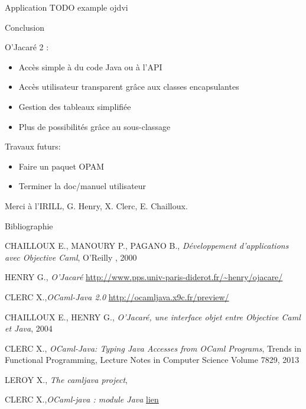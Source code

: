 \documentclass[xcolor={table,dvipsnames}]{beamer}
\begin{document}
\begin{frame}{Application}
TODO example ojdvi
\end{frame}


\begin{frame}{Conclusion}

O'Jacaré 2 :
\begin{itemize}
\item Accès simple à du code Java ou à l'API
\item Accès utilisateur transparent grâce aux classes encapsulantes
\item Gestion des tableaux simplifiée
\item Plus de possibilités grâce au sous-classage
\end{itemize}

Travaux futurs:
\begin{itemize}
\item Faire un paquet OPAM
\item Terminer la doc/manuel utilisateur
\end{itemize}
\bigskip
Merci à l'IRILL, G. Henry, X. Clerc, E. Chailloux.
\end{frame}












\begin{frame}{Bibliographie}

  \begin{thebibliography}{}
   CHAILLOUX E., MANOURY P., PAGANO B., \emph{Développement
    d'applications avec Objective Caml}, O'Reilly
    , 2000

  \bibitem{}  HENRY G., \emph{O’Jacaré} \url{http://www.pps.univ-paris-diderot.fr/~henry/ojacare/}

  \bibitem{}  CLERC X.,\emph{OCaml-Java 2.0} \url{http://ocamljava.x9c.fr/preview/}

  \bibitem{} CHAILLOUX E., HENRY G., \emph{O’Jacaré, une interface objet
    entre Objective Caml et Java}, 2004

  \bibitem{} CLERC X., \emph{OCaml-Java: Typing Java Accesses from OCaml
    Programs}, Trends in Functional Programming, Lecture Notes in
    Computer Science Volume 7829,
    2013

   LEROY X., \emph{The camljava project},

   CLERC X.,\emph{OCaml-java : module Java} \href{http://ocamljava.x9c.fr/preview/javalib/index.html}{lien}

  \end{thebibliography}
\end{frame}
\end{document}
